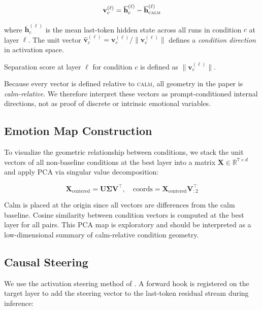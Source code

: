 \documentclass[11pt,a4paper]{article}
\begin{document}
\begin{equation}
\mathbf{v}_c^{(\ell)} = \overline{\mathbf{h}}_c^{(\ell)} - \overline{\mathbf{h}}_{\textsc{calm}}^{(\ell)}
\end{equation}

where $\overline{\mathbf{h}}_c^{(\ell)}$ is the mean last-token hidden state across all runs in condition $c$ at layer $\ell$. The unit vector $\hat{\mathbf{v}}_c^{(\ell)} = \mathbf{v}_c^{(\ell)} / \|\mathbf{v}_c^{(\ell)}\|$ defines a \emph{condition direction} in activation space.

Separation score at layer $\ell$ for condition $c$ is defined as $\|\mathbf{v}_c^{(\ell)}\|$.

Because every vector is defined relative to \textsc{calm}, all geometry in the paper is \emph{calm-relative}. We therefore interpret these vectors as prompt-conditioned internal directions, not as proof of discrete or intrinsic emotional variables.

\subsection{Emotion Map Construction}

To visualize the geometric relationship between conditions, we stack the unit vectors of all non-baseline conditions at the best layer into a matrix $\mathbf{X} \in \mathbb{R}^{7 \times d}$ and apply PCA via singular value decomposition:

\begin{equation}
\mathbf{X}_{\text{centered}} = \mathbf{U} \boldsymbol{\Sigma} \mathbf{V}^\top, \quad \text{coords} = \mathbf{X}_{\text{centered}} \mathbf{V}_{:2}^\top
\end{equation}

Calm is placed at the origin since all vectors are differences from the calm baseline. Cosine similarity between condition vectors is computed at the best layer for all pairs. This PCA map is exploratory and should be interpreted as a low-dimensional summary of calm-relative condition geometry.

\subsection{Causal Steering}

We use the activation steering method of \citet{turner2023activation}. A forward hook is registered on the target layer to add the steering vector to the last-token residual stream during inference:
\end{document}
